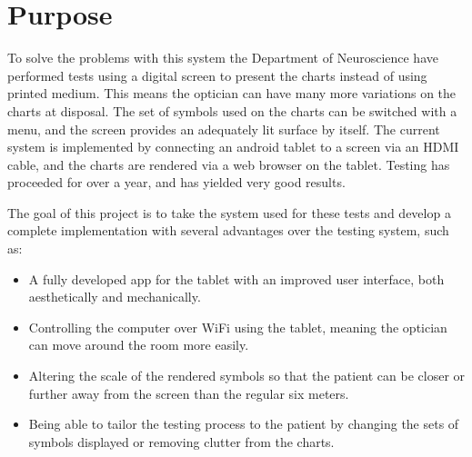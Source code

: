 \documentclass[12pt,a4paper,notitlepage]{report}
\begin{document}


\section{Purpose}
To solve the problems with this system the Department of Neuroscience have performed tests using a digital screen to present the charts instead of using printed medium. This means the optician can have many more variations on the charts at disposal. The set of symbols used on the charts can be switched with a menu, and the screen provides an adequately lit surface by itself. The current system is implemented by connecting an android tablet to a screen via an HDMI cable, and the charts are rendered via a web browser on the tablet. Testing has proceeded for over a year, and has yielded very good results.

The goal of this project is to take the system used for these tests and develop a complete implementation with several advantages over the testing system, such as:

\begin{itemize}
	\item A fully developed app for the tablet with an improved user interface, both aesthetically and mechanically.
	\item Controlling the computer over WiFi using the tablet, meaning the optician can move around the room more easily.
	\item Altering the scale of the rendered symbols so that the patient can be closer or further away from the screen than the regular six meters.
	\item Being able to tailor the testing process to the patient by changing the sets of symbols displayed or removing clutter from the charts.
\end{itemize}
	
\end{document}

